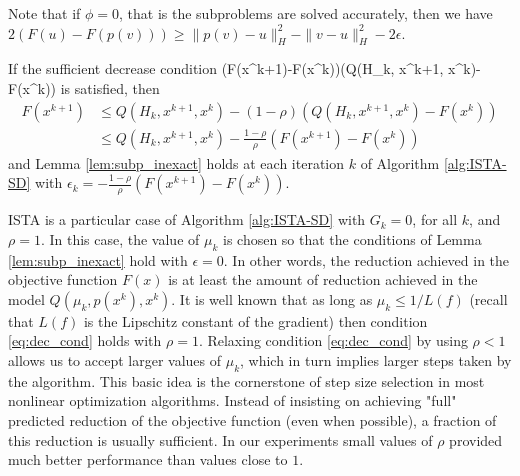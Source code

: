 \documentclass[11pt]{article}
\numberwithin{equation}{section}
\begin{document}
\vskip5mm

Note that if $\phi=0$, that is the subproblems are solved accurately, then we have $2(F(u) - F(p( v))) \geq \|p( v)-u\|_H^2 - \|v-u\|_H^2-2\epsilon$.

If the sufficient decrease  condition 
\bea\label{eq:dec_cond}
(F(x^{k+1})-F(x^k))\leq \rho (Q(H_k, x^{k+1}, x^k)- F(x^k))
\eea
is satisfied, then
\begin{align*}
    F(x^{k+1})
    &\leq Q(H_k, x^{k+1}, x^k)  - (1-\rho) \left( Q(H_k, x^{k+1}, x^k)- F(x^k) \right) \\
    &\leq Q(H_k,  x^{k+1}, x^k)  - \frac{1-\rho}{\rho} (F(x^{k+1})- F(x^k))
\end{align*}
and  Lemma \ref{lem:subp_inexact} holds at each iteration $k$ of Algorithm \ref{alg:ISTA-SD} with  $\epsilon_k=-\frac{1-\rho}{\rho}(F(x^{k+1})- F(x^k))$. 

 ISTA  \cite{Beck2009} is a particular case of Algorithm \ref{alg:ISTA-SD} with $G_k=0$, for all $k$, and $\rho=1$. 
In this case, the value of  $\mu_k$ is chosen so that the conditions of Lemma \ref{lem:subp_inexact} hold with $\epsilon=0$. In other words, the reduction achieved in the objective function $F(x)$ is at least the amount of reduction achieved in the model 
$ Q(\mu_k,p(x^k),x^k)$. It is well known that as long as $\mu_k\leq 1/L(f)$ (recall that $L(f)$ is the Lipschitz constant of the gradient) then  condition \eqref{eq:dec_cond}
 holds with $\rho=1$.  Relaxing condition \eqref{eq:dec_cond} by using $\rho<1$ allows us to accept larger values of $\mu_k$, which in turn implies larger steps taken by the algorithm.   This basic idea is the cornerstone of step size selection in most nonlinear optimization algorithms. Instead of insisting on achieving "full" predicted reduction of the objective function (even when possible), a fraction of this reduction is usually sufficient. In our experiments small values of $\rho$ provided much better performance than values close to $1$. 
\end{document}
